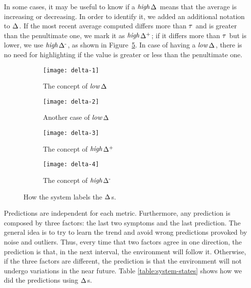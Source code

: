 \documentclass{llncs}
\newcommand{\ourDelta}[2][]{\ensuremath{\Delta\textsuperscript{\text{#1}}
\textsubscript{\text{#2}}}}
\newcommand{\high}[1][ ]{\ensuremath{\text{\emph{high}}#1}}
\newcommand{\low}[1][ ]{\ensuremath{\text{\emph{low}}#1}}
\newcommand{\highDelta}[2][]{\high{\ourDelta[#1]{#2}}}
\newcommand{\lowDelta}[2][]{\low{\ourDelta[#1]{#2}}}
\newcommand{\threshold}[1][]{\ensuremath{\tau\textsubscript{#1}}}
\begin{document}
In some cases, it may be useful to know if a \highDelta{} means that the 
average is increasing or decreasing. In order to identify it, we added an 
additional notation to \ourDelta{}. If the most recent average computed 
differs more than \threshold{} and is greater 
than the penultimate one, we mark it as \highDelta[+]{}; 
if it differs more than \threshold{} but is lower, we use 
\highDelta[-]{}, as shown in Figure~\ref{fig:delta}.
In case of having a \lowDelta{}, there is no need for highlighting if the value 
is greater or less than the penultimate one.

\begin{figure}[h]
	\centering
	\begin{subfigure}[t]{0.21\textwidth}
		\centering
		
\texttt{[image: delta-1]}
		\caption{The concept of \lowDelta{}}
		\label{fig:delta-low-plus}
	\end{subfigure}\qquad
	\begin{subfigure}[t]{0.21\textwidth}
		\centering
		
\texttt{[image: delta-2]}
		\caption{Another case of \lowDelta{}}
		\label{fig:delta-low-minus}
	\end{subfigure}\qquad
	\begin{subfigure}[t]{0.21\textwidth}
		\centering
		
\texttt{[image: delta-3]}
		\caption{The concept of \highDelta[+]{}}
		\label{fig:delta-high-plus}
	\end{subfigure}\qquad
	\begin{subfigure}[t]{0.21\textwidth}
		\centering
		
\texttt{[image: delta-4]}
		\caption{The concept of \highDelta[-]{}}
		\label{fig:delta-high-minus}
	\end{subfigure}\caption{How the system labels the \ourDelta{}s.}
	\label{fig:delta}

\end{figure}

Predictions are independent for each metric.
Furthermore, any prediction is 
composed by three factors: the last two symptoms and the last prediction. The 
general idea is to try to learn the trend and avoid wrong predictions provoked 
by noise and outliers. Thus, every time that two factors agree in one 
direction, the prediction is that, in the next interval, the environment will 
follow it. 
Otherwise, if the three factors are different, the prediction is that the 
environment will not undergo variations in the near future. 
Table \ref{table:system-states} shows how we did the predictions using
\ourDelta{}s.
\end{document}
